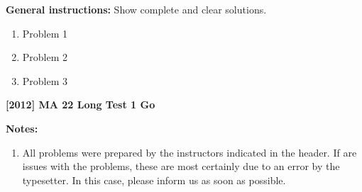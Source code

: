 \documentclass[a4paper,12pt]{article}
\begin{document}
\textbf{General instructions:} Show complete and clear solutions.

\begin{enumerate}[before={\everymath{\displaystyle}}]
		
    
    \item \label{itm:p1} Problem 1 
    
    \item \label{itm:p2} Problem 2 
    
    \item \label{itm:p3} Problem 3 
    
\end{enumerate}

\begin{closing}
    \textbf{[2012] MA 22 Long Test 1 Go}

    \textbf{Notes:} \begin{enumerate}
        \setlength\itemsep{-5pt}
        \item[] All problems were prepared by the instructors indicated in the header. If are issues with the problems, these are most certainly due to an error by the typesetter. In this case, please inform us as soon as possible. 
    \end{enumerate}
\end{closing}
\end{document}

